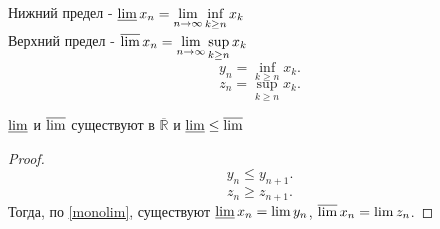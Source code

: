 \documentclass[11pt, oneside]{article}   	%
\begin{document}
    \begin{definition}
        Нижний предел - $\varliminf x_n = \lim\limits_{n \to \infty} \inf\limits_{k\ge n} x_k$ \\
        Верхний предел - $\varlimsup x_n = \lim\limits_{n \to \infty} \sup\limits_{k\ge n} x_k $ \\
        \[ y_n =\inf\limits_{k\ge n}x_k .\]
        \[ z_n = \sup\limits_{k\ge n}x_k .\]
    \end{definition}
    \begin{theorem}
        $\varliminf$ и  $\varlimsup$ существуют в $\overline{\mathbb{R}}$ и $\varliminf \le \varlimsup$ 
        \begin{proof}
            \[ y_n \le y_{n+1} .\]
            \[ z_{n} \ge z_{n+1} .\]
            Тогда, по \ref{monolim}, существуют $\varliminf x_n = \lim y_n$,  $\varlimsup x_n = \lim z_n$.
        \end{proof}
        
    \end{theorem}
\end{document}
